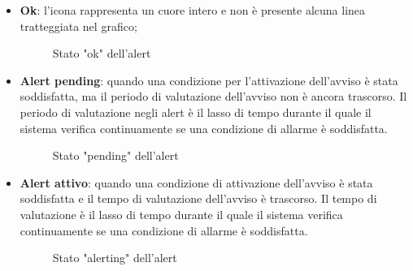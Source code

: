\begin{itemize}
    \item \textbf{Ok}: l'icona rappresenta un cuore intero e non è presente alcuna linea tratteggiata nel grafico;
    \begin{figure}[H]
        \centering
        \caption{Stato "ok" dell'alert}
        \label{fig:my_label}
    \end{figure}
    \item \textbf{Alert pending}: 
    quando una condizione per l'attivazione dell'avviso è stata soddisfatta, ma il periodo di valutazione dell'avviso non è ancora trascorso. Il periodo di valutazione negli alert è il lasso di tempo durante il quale il sistema verifica continuamente se una condizione di allarme è soddisfatta. 
    \begin{figure}[H]
        \centering
        \caption{Stato "pending" dell'alert}
        \label{fig:my_label}
    \end{figure}
    \item \textbf{Alert attivo}: quando una condizione di attivazione dell'avviso è stata soddisfatta e il tempo di valutazione dell'avviso è trascorso. Il tempo di valutazione è il lasso di tempo durante il quale il sistema verifica continuamente se una condizione di allarme è soddisfatta.
    \begin{figure}[H]
        \centering
        \caption{Stato "alerting" dell'alert}
        \label{fig:my_label}
    \end{figure}
\end{itemize}

